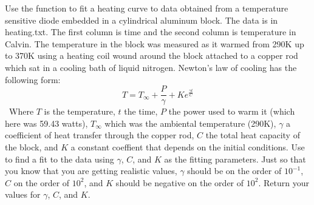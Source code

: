 \begin{problem}
Use the  function to fit a heating curve to data obtained from a temperature sensitive diode embedded in a cylindrical aluminum block. The data is in heating.txt. The first column is time and the second column is temperature in Calvin. The temperature in the block was measured as it warmed from 290K up to 370K using a heating coil wound around the block attached to a copper rod which sat in a cooling bath of liquid nitrogen. 
Newton's law of cooling has the following form:
\[
T = T_{\infty} + \frac{P}{\gamma}+Ke^{\frac{\gamma t}{C}}
\]\
Where $T$ is the temperature, $t$ the time, $P$ the power used to warm it (which here was 59.43 watts), $T_{\infty}$ which was the ambiental temperature (290K), $\gamma$ a coefficient of heat transfer through the copper rod, $C$ the total heat capacity of the block, and $K$ a constant coeffient that depends on the initial conditions. Use  to find a fit to the data using $\gamma$, $C$, and $K$ as the fitting parameters. Just so that you know that you are getting realistic values, $\gamma$ should be on the order of $10^{-1}$, $C$ on the order of $10^{2}$, and $K$ should be negative on the order of $10^{2}$. Return your values for $\gamma$, $C$, and $K$.

\end{problem}

